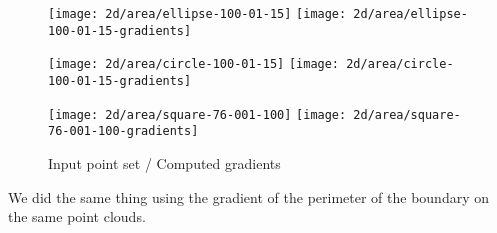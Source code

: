 \begin{figure}[H]
    \centering

    \begin{minipage}{0.8\linewidth}
        \centering
        \texttt{[image: 2d/area/ellipse-100-01-15]}
        \texttt{[image: 2d/area/ellipse-100-01-15-gradients]}
        \label{fig:gradients_area_2d_ellipse}
    \end{minipage}

    \begin{minipage}{0.8\linewidth}
        \centering
        \texttt{[image: 2d/area/circle-100-01-15]}
        \texttt{[image: 2d/area/circle-100-01-15-gradients]}
        \label{fig:gradients_area_2d_circle}
    \end{minipage}

    \begin{minipage}{0.8\linewidth}
        \centering
        \texttt{[image: 2d/area/square-76-001-100]}
        \texttt{[image: 2d/area/square-76-001-100-gradients]}
        \label{fig:gradients_area_2d_square}
    \end{minipage}

    \caption{Input point set / Computed gradients}
    \label{fig:gradients_area_2d}
\end{figure}

We did the same thing using the gradient of the perimeter of the boundary on the
same point clouds.

